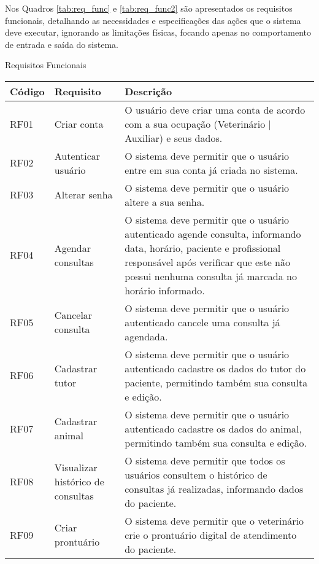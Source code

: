 \documentclass[
    12pt,               %
    openright,          %
    oneside,
    a4paper,            %
    BIBLATEX,           %
    TODO,               %
    english,            %
    brazil              %
    ]{ifsp-spo-inf-ctds}
\begin{document}
            Nos Quadros \ref{tab:req_func} e \ref{tab:req_func2} são apresentados os requisitos funcionais, detalhando as necessidades e especificações das ações que o sistema deve executar, ignorando as limitações físicas, focando apenas no comportamento de entrada e saída do sistema.

            \begin{center}
                \begin{quadro}[H]
                \caption{Requisitos Funcionais}
                \begin{tabulary}{1.0\textwidth}{|p{5em}|p{8em}|p{18em}|}
                \hline
                Código & Requisito & Descrição\\
                \hline
                RF01 & Criar conta & O usuário deve criar uma conta de acordo com a sua ocupação (Veterinário | Auxiliar) e seus dados.\\
                \hline
                RF02 & Autenticar usuário & O sistema deve permitir que o usuário entre em sua conta já criada no sistema.\\
                \hline
                RF03 & Alterar senha & O sistema deve permitir que o usuário altere a sua senha.\\
                \hline
                RF04 & Agendar consultas & O sistema deve permitir que o usuário autenticado agende consulta, informando data, horário, paciente e profissional responsável após verificar que este não possui nenhuma consulta já marcada no horário informado.\\
                \hline
                RF05 & Cancelar consulta & O sistema deve permitir que o usuário autenticado cancele uma consulta já agendada.\\
                \hline
                RF06 & Cadastrar tutor & O sistema deve permitir que o usuário autenticado cadastre os dados do tutor do paciente, permitindo também sua consulta e edição.\\
                \hline
                RF07 & Cadastrar animal & O sistema deve permitir que o usuário autenticado cadastre os dados do animal, permitindo também sua consulta e edição.\\
                \hline
                RF08 & Visualizar histórico de consultas & O sistema deve permitir que todos os usuários consultem o histórico de consultas já realizadas, informando dados do paciente.\\
                \hline
                RF09 & Criar prontuário & O sistema deve permitir que o veterinário crie o prontuário digital de atendimento do paciente.\\

\end{tabulary}
\end{quadro}
\end{center}
\end{document}
